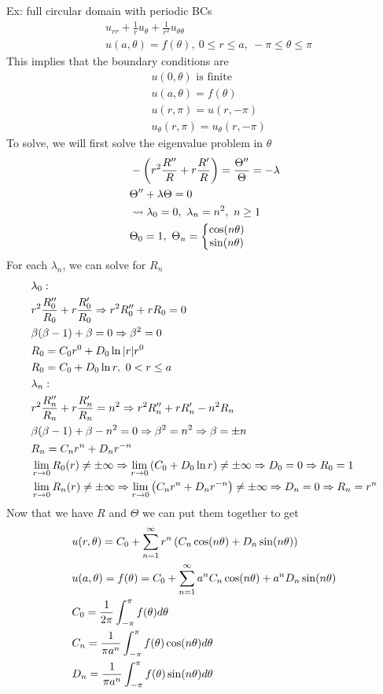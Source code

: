 \documentclass[11pt, fleqn]{article}
\begin{document}
Ex: full circular domain with periodic BCs
\begin{align*}
    &u_{rr}+\frac{1}{r}u_\theta+\frac{1}{r^2}u_{\theta\theta}\\
    &u(a,\theta)=f(\theta),\ 0\leq r\leq a,\ -\pi\leq\theta\leq\pi
\end{align*}
This implies that the boundary conditions are
\begin{align*}
    &u(0,\theta)\text{ is finite}\\
    &u(a,\theta)=f(\theta)\\
    &u(r,\pi)=u(r,-\pi)\\
    &u_\theta(r,\pi)=u_\theta(r,-\pi)
\end{align*}
To solve, we will first solve the eigenvalue problem in $\theta$
\begin{align*}
    &-\left( r^2\frac{R''}{R}+r\frac{R'}{R} \right)=\frac{\Theta''}{\Theta}=-\lambda\\
    &\Theta''+\lambda\Theta=0\\
    &\leadsto \lambda_0=0,\ \lambda_n=n^2,\ n\geq1\\
    &\Theta_0=1,\ \Theta_n=\left\{\begin{matrix} \cos(n\theta)\\\sin(n\theta) \end{matrix}\right.
\end{align*}
For each $\lambda_n$, we can solve for $R_n$
\begin{align*}
    &\lambda_0:\\
    &r^2\frac{R_0''}{R_0}+r\frac{R_0'}{R_0}\Rightarrow r^2R_0''+rR_0=0\\
    &\beta(\beta-1)+\beta=0\Rightarrow \beta^2=0\\
    &R_0=C_0r^0+D_0\ln|r|r^0\\
    &R_0=C_0+D_0\ln r,\ 0<r\leq a\\
    &\lambda_n:\\
    &r^2\frac{R_n''}{R_n}+r\frac{R_n'}{R_n}=n^2\Rightarrow r^2R_n''+rR_n'-n^2R_n\\
    &\beta(\beta-1)+\beta-n^2=0\Rightarrow \beta^2=n^2\Rightarrow \beta=\pm n\\
    &R_n=C_nr^n+D_nr^{-n}\\
    &\lim_{r\to0} R_0(r)\neq\pm\infty\Rightarrow \lim_{r\to0}\left( C_0+D_0\ln r \right)\neq\pm\infty\Rightarrow D_0=0\Rightarrow R_0=1\\
    &\lim_{r\to0} R_n(r)\neq\pm\infty\Rightarrow \lim_{r\to0}\left( C_nr^n+D_nr^{-n} \right)\neq\pm\infty\Rightarrow D_n=0\Rightarrow R_n=r^n
\end{align*}
Now that we have $R$ and $\Theta$ we can put them together to get
\begin{align*}
    &u(r,\theta)=C_0+\sum_{n=1}^\infty r^n\left( C_n\cos(n\theta)+D_n\sin(n\theta) \right)\\
    &u(a,\theta)=f(\theta)=C_0+\sum_{n=1}^\infty a^nC_n\cos(n\theta)+a^nD_n\sin(n\theta)\\
    &C_0=\frac{1}{2\pi}\int_{-\pi}^\pi f(\theta)d\theta\\
    &C_n=\frac{1}{\pi a^n}\int_{-\pi}^\pi f(\theta)\cos(n\theta)d\theta\\
    &D_n=\frac{1}{\pi a^n}\int_{-\pi}^\pi f(\theta)\sin(n\theta)d\theta
\end{align*}
\end{document}
